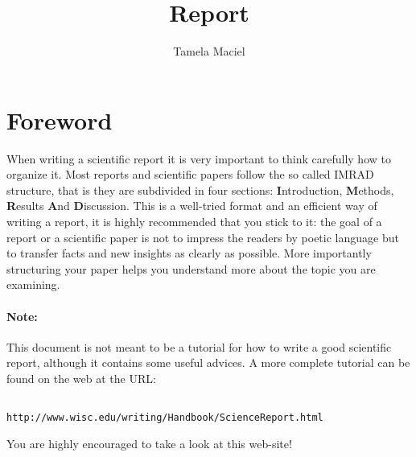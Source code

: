 \documentclass[a4paper,10pt]{article}
\begin{document}
%
   \title{Report}

   \author{Tamela Maciel}
          
   \date{}

   \maketitle
   
 
    
\section*{Foreword}
When writing a scientific report it is very important to think
carefully how to organize it.
Most reports and scientific papers follow the so called IMRAD structure,
that is they are subdivided in four sections: \textbf{I}ntroduction, 
\textbf{M}ethods, \textbf{R}esults \textbf{A}nd \textbf{D}iscussion.
This is a well-tried format and an efficient way of writing a report,
it is highly recommended that you stick to it: 
the goal of a report or a scientific paper is not to impress 
the readers by poetic language but to transfer facts and new insights 
as clearly as possible. 
More importantly structuring your paper   
helps you understand more about the topic you are examining.

\paragraph{Note:}
This document is not meant to be a tutorial for how to write
a good scientific report, although it contains some useful advices.
A more complete tutorial can be found on the web at the URL:
\begin{verbatim}

http://www.wisc.edu/writing/Handbook/ScienceReport.html

\end{verbatim}
You are highly encouraged to take a look at this web-site!
\end{document}
